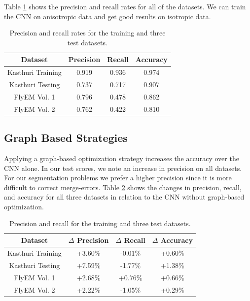 Table \ref{table:classification} shows the precision and recall rates for all of the datasets. We can train the CNN on anisotropic data and get good results on isotropic data. 

\begin{table}[h]
	\centering
	\begin{tabular}{c c c c} \hline
		\textbf{Dataset} & \textbf{Precision} & \textbf{Recall} & \textbf{Accuracy} \\ \hline
		Kasthuri Training & 0.919 & 0.936 & 0.974 \\
		Kasthuri Testing & 0.737 & 0.717 & 0.907 \\
		FlyEM Vol. 1 & 0.796 & 0.478 & 0.862 \\
		FlyEM Vol. 2 & 0.762 & 0.422 & 0.810 \\ \hline
	\end{tabular}
	\caption{Precision and recall rates for the training and three test datasets.}
	\label{table:classification}
\end{table}

\subsection{Graph Based Strategies}

Applying a graph-based optimization strategy increases the accuracy over the CNN alone. In our test scores, we note an increase in precision on all datasets. For our segmentation problems we prefer a higher precision since it is more difficult to correct merge-errors. Table \ref{table:multicut} shows the changes in precision, recall, and accuracy for all three datasets in relation to the CNN without graph-based optimization. 

\begin{table}[h]
	\centering
	\begin{tabular}{c c c c} \hline
		\textbf{Dataset} & $\Delta$ \textbf{Precision} & $\Delta$ \textbf{Recall} & $\Delta$ \textbf{Accuracy} \\ \hline
		Kasthuri Training & +3.60\% & -0.01\% & +0.60\% \\
		Kasthuri Testing & +7.59\% & -1.77\% & +1.38\% \\
		FlyEM Vol. 1 & +2.68\% & +0.76\% & +0.66\% \\
		FlyEM Vol. 2 & +2.22\% & -1.05\% & +0.29\% \\ \hline
	\end{tabular}
	\caption{Precision and recall for the training and three test datasets.}
	\label{table:multicut}
\end{table}
